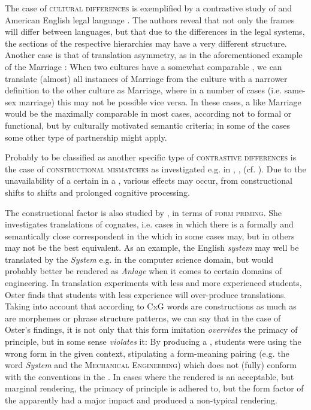 \documentclass[output=paper]{LSP/langsci}
\begin{document}
The case of \textsc{cultural differences} is exemplified by a contrastive study of  and American English legal language \citep{Bertoldi2012}. The authors reveal that not only the frames will differ between languages, but that due to the differences in the legal systems, the sections of the respective  hierarchies may have a very different structure. Another case is that of translation asymmetry, as in the aforementioned example of the Marriage : When two cultures have a somewhat comparable , we can translate (almost) all instances of Marriage from the culture with a narrower definition to the other culture as Marriage, where in a number of cases (i.e. same-sex marriage) this may not be possible vice versa. In these cases, a  like Marriage would be the maximally comparable  in most cases, according not to formal or functional, but by culturally motivated semantic criteria; in some of the cases some other type of partnership  might apply.

Probably to be classified as another specific type of \textsc{contrastive differences} is the case of \textsc{constructional mismatches} as investigated e.g. in \citet{Culo2013}, \citet{Rojo2013}, \citet{Serbina2013} (cf. ). Due to the unavailability of a certain  in a , various effects may occur, from constructional shifts to  shifts and prolonged cognitive processing.

The constructional factor is also studied by , in terms of \textsc{form priming}. She investigates translations of cognates, i.e. cases in which there is a formally and semantically close correspondent in the  which in some cases may, but in others may not be the best equivalent. As an example, the English \textit{system} may well be translated by the  \textit{System} e.g. in the computer science domain, but would probably better be rendered as \textit{Anlage} when it comes to certain domains of engineering. In translation experiments with less and more experienced students, Oster finds that students with less experience will over-produce  translations. Taking into account that according to CxG words are constructions as much as are morphemes or phrase structure patterns, we can say that in the case of Oster's findings, it is not only that this form imitation \textit{overrides} the primacy of  principle, but in some sense \textit{violates} it: By producing a , students were using the wrong form in the given context, stipulating a form-meaning pairing (e.g. the word \textit{System} and the  \textsc{Mechanical Engineering}) which does not (fully) conform with the conventions in the . In cases where the rendered  is an acceptable, but marginal rendering, the primacy of  principle is adhered to, but the form factor of the  apparently had a major impact and produced a non-typical rendering.
\end{document}
